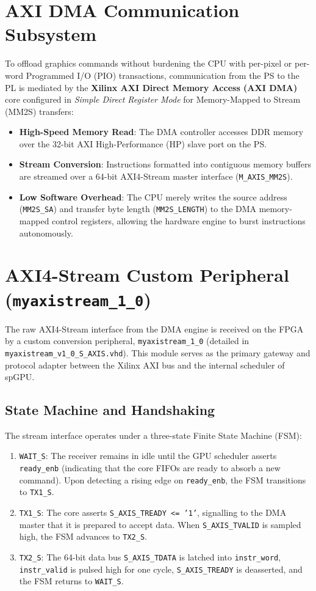 \section{AXI DMA Communication Subsystem}
To offload graphics commands without burdening the CPU with per-pixel or per-word Programmed I/O (PIO) transactions, communication from the PS to the PL is mediated by the \textbf{Xilinx AXI Direct Memory Access (AXI DMA)} core configured in \textit{Simple Direct Register Mode} for Memory-Mapped to Stream (MM2S) transfers:
\begin{itemize}
    \item \textbf{High-Speed Memory Read}: The DMA controller accesses DDR memory over the 32-bit AXI High-Performance (HP) slave port on the PS.
    \item \textbf{Stream Conversion}: Instructions formatted into contiguous memory buffers are streamed over a 64-bit AXI4-Stream master interface (\texttt{M\_AXIS\_MM2S}).
    \item \textbf{Low Software Overhead}: The CPU merely writes the source address (\texttt{MM2S\_SA}) and transfer byte length (\texttt{MM2S\_LENGTH}) to the DMA memory-mapped control registers, allowing the hardware engine to burst instructions autonomously.
\end{itemize}

\section{AXI4-Stream Custom Peripheral (\texttt{myaxistream\_1\_0})}
The raw AXI4-Stream interface from the DMA engine is received on the FPGA by a custom conversion peripheral, \texttt{myaxistream\_1\_0} (detailed in \texttt{myaxistream\_v1\_0\_S\_AXIS.vhd}). This module serves as the primary gateway and protocol adapter between the Xilinx AXI bus and the internal scheduler of spGPU.

\subsection{State Machine and Handshaking}
The stream interface operates under a three-state Finite State Machine (FSM):
\begin{enumerate}
    \item \texttt{WAIT\_S}: The receiver remains in idle until the GPU scheduler asserts \texttt{ready\_enb} (indicating that the core FIFOs are ready to absorb a new command). Upon detecting a rising edge on \texttt{ready\_enb}, the FSM transitions to \texttt{TX1\_S}.
    \item \texttt{TX1\_S}: The core asserts \texttt{S\_AXIS\_TREADY <= '1'}, signalling to the DMA master that it is prepared to accept data. When \texttt{S\_AXIS\_TVALID} is sampled high, the FSM advances to \texttt{TX2\_S}.
    \item \texttt{TX2\_S}: The 64-bit data bus \texttt{S\_AXIS\_TDATA} is latched into \texttt{instr\_word}, \texttt{instr\_valid} is pulsed high for one cycle, \texttt{S\_AXIS\_TREADY} is deasserted, and the FSM returns to \texttt{WAIT\_S}.
\end{enumerate}

